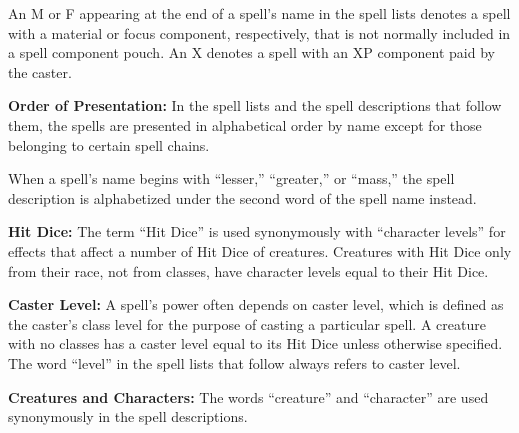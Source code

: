 
An M or F appearing at the end of a spell's name in the spell lists denotes a spell with a material or focus component, respectively, that is not normally included in a spell component pouch. An X denotes a spell with an XP component paid by the caster.

\textbf{Order of Presentation:} In the spell lists and the spell descriptions that follow them, the spells are presented in alphabetical order by name except for those belonging to certain spell chains.

When a spell's name begins with ``lesser,'' ``greater,'' or ``mass,'' the spell description is alphabetized under the second word of the spell name instead.

\textbf{Hit Dice:} The term ``Hit Dice'' is used synonymously with ``character levels'' for effects that affect a number of Hit Dice of creatures. Creatures with Hit Dice only from their race, not from classes, have character levels equal to their Hit Dice.

\textbf{Caster Level:} A spell's power often depends on caster level, which is defined as the caster's class level for the purpose of casting a particular spell. A creature with no classes has a caster level equal to its Hit Dice unless otherwise specified. The word ``level'' in the spell lists that follow always refers to caster level.

\textbf{Creatures and Characters:} The words ``creature'' and ``character'' are used synonymously in the spell descriptions.


